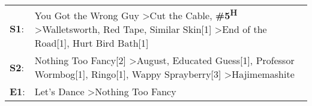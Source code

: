 \begin{supertabular}{p{0.03\textwidth}p{0.92\textwidth}}
 \textbf{S1}:  &  You Got the Wrong Guy\textsuperscript{} \textgreater \enspace Cut the Cable\textsuperscript{}, \enspace \textbf{\#5\textsuperscript{H}} \textgreater \enspace Walletsworth\textsuperscript{}, \enspace Red Tape\textsuperscript{}, \enspace Similar Skin[1]\textsuperscript{} \textgreater \enspace End of the Road[1]\textsuperscript{}, \enspace Hurt Bird Bath[1]\textsuperscript{}  \enspace  \\
 \textbf{S2}:  &                                                         Nothing Too Fancy[2]\textsuperscript{} \textgreater \enspace August\textsuperscript{}, \enspace Educated Guess[1]\textsuperscript{}, \enspace Professor Wormbog[1]\textsuperscript{}, \enspace Ringo[1]\textsuperscript{}, \enspace Wappy Sprayberry[3]\textsuperscript{} \textgreater \enspace Hajimemashite\textsuperscript{}  \enspace  \\
 \textbf{E1}:  &                                                                                                                                                                                                                                                                                                 Let's Dance\textsuperscript{} \textgreater \enspace Nothing Too Fancy\textsuperscript{}  \enspace  \\
\end{supertabular}
